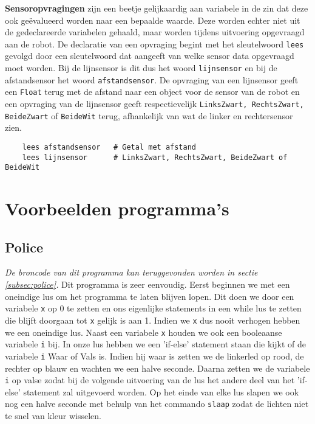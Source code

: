 \documentclass[12pt, titlepage]{article}
\begin{document}
\begin{description}
\item{\bf Sensoropvragingen} zijn een beetje gelijkaardig aan variabele in de zin dat deze ook geëvalueerd worden naar een bepaalde waarde. Deze worden echter niet uit de gedeclareerde variabelen gehaald, maar worden tijdens uitvoering opgevraagd aan de robot. De declaratie van een opvraging begint met het sleutelwoord \texttt{lees} gevolgd door een sleutelwoord dat aangeeft van welke sensor data opgevraagd moet worden. Bij de lijnsensor is dit dus het woord \texttt{lijnsensor} en bij de afstandsensor het woord \texttt{afstandsensor}. De opvraging van een lijnsensor geeft een \texttt{Float} terug met de afstand naar een object voor de sensor van de robot en een opvraging van de lijnsensor geeft respectievelijk \texttt{LinksZwart, RechtsZwart, BeideZwart} of \texttt{BeideWit} terug, afhankelijk van wat de linker en rechtersensor zien.
\newline
\begin{lstlisting}
    lees afstandsensor   # Getal met afstand
    lees lijnsensor      # LinksZwart, RechtsZwart, BeideZwart of BeideWit
\end{lstlisting}

\end{description}
\newpage
\section{Voorbeelden programma's}
\label{sec:voorbeelden_programma_s}
\subsection{Police}
\emph{De broncode van dit programma kan teruggevonden worden in sectie \ref{subsec:police}.}
\newline
\newline
Dit programma is zeer eenvoudig. Eerst beginnen we met een oneindige lus om het programma te laten blijven lopen. Dit doen we door een variabele \texttt{x} op 0 te zetten en ons eigenlijke statements in een while lus te zetten die blijft doorgaan tot \texttt{x} gelijk is aan 1. Indien we \texttt{x} dus nooit verhogen hebben we een oneindige lus. Naast een variabele \texttt{x} houden we ook een booleaanse variabele \texttt{i} bij. In onze lus hebben we een 'if-else' statement staan die kijkt of de variabele \texttt{i} Waar of Vals is. Indien hij waar is zetten we de linkerled op rood, de rechter op blauw en wachten we een halve seconde. Daarna zetten we de variabele \texttt{i} op valse zodat bij de volgende uitvoering van de lus het andere deel van het 'if-else' statement zal uitgevoerd worden. Op het einde van elke lus slapen we ook nog een halve seconde met behulp van het commando \texttt{slaap} zodat de lichten niet te snel van kleur wisselen.
\end{document}
